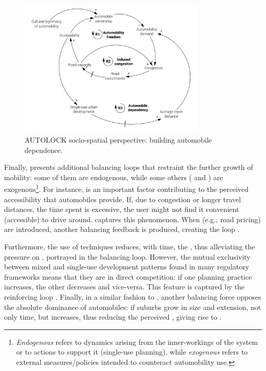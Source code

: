 \begin{figure}[h]
\centering
\includegraphics[width=0.8\textwidth]{figures/model/cropped/congestion-urban_2_dependency.pdf}
\caption{AUTOLOCK socio-spatial perspective: building automobile dependence.}
\label{f:results:cld_congestion_2}
\end{figure}

Finally,  presents additional balancing loops that restraint the further growth of mobility: some of them are endogenous, while some others ( and ) are exogenous\footnote{\emph{Endogenous} refers to dynamics arising from the inner-workings of the system or to actions to support it (single-use planning), while \emph{exogenous} refers to external measures/policies intended to counteract automobility use.}. For instance,  is an important factor contributing to the perceived accessibility that automobiles provide. If, due to congestion or longer travel distances, the time spent is excessive, the user might not find it convenient (accessible) to drive around.  captures this phenomenon. When  (e.g., road pricing) are introduced, another balancing feedback is produced, creating the  loop \parencite{banister2008_sustainablemobilityparadigm,dudley2012_DynamicsRegimeStrength}.

Furthermore, the use of  techniques reduces, with time, the , thus alleviating the pressure on , portrayed in the  balancing loop. However, the mutual exclusivity between mixed and single-use development patterns found in many regulatory frameworks \parencite{hirt2007_DevilIsDefinitions} means that they are in direct competition: if one planning practice increases, the other decreases and vice-versa. This feature is captured by the reinforcing loop . Finally, in a similar fashion to , another balancing force opposes the absolute dominance of automobiles: if suburbs grow in size and extension, not only time, but  increases, thus reducing the perceived , giving rise to .

